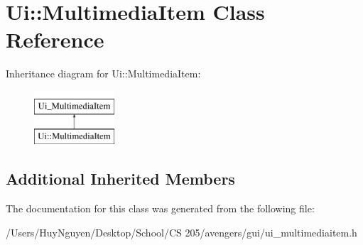 \hypertarget{classUi_1_1MultimediaItem}{}\section{Ui\+:\+:Multimedia\+Item Class Reference}
\label{classUi_1_1MultimediaItem}
Inheritance diagram for Ui\+:\+:Multimedia\+Item\+:\begin{figure}[H]
\begin{center}
\leavevmode
\includegraphics[height=2.000000cm]{classUi_1_1MultimediaItem}
\end{center}
\end{figure}
\subsection*{Additional Inherited Members}


The documentation for this class was generated from the following file\+:\begin{DoxyCompactItemize}
\item 
/\+Users/\+Huy\+Nguyen/\+Desktop/\+School/\+C\+S 205/avengers/gui/ui\+\_\+multimediaitem.\+h\end{DoxyCompactItemize}

